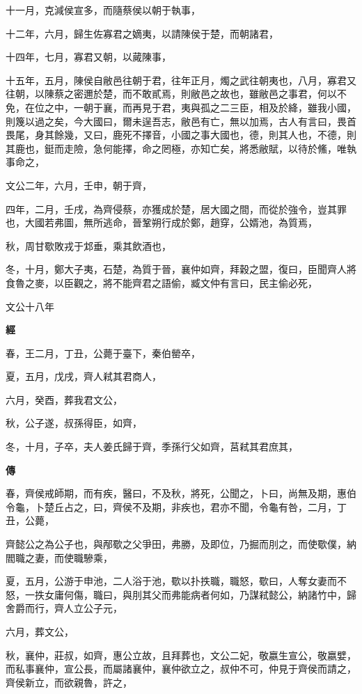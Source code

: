 \documentclass{ctexart}
\begin{document}
十一月，克減侯宣多，而隨蔡侯以朝于執事，

十二年，六月，歸生佐寡君之嫡夷，以請陳侯于楚，而朝諸君，

十四年，七月，寡君又朝，以蕆陳事，

十五年，五月，陳侯自敝邑往朝于君，往年正月，燭之武往朝夷也，八月，寡君又往朝，以陳蔡之密邇於楚，而不敢貳焉，則敝邑之故也，雖敝邑之事君，何以不免，在位之中，一朝于襄，而再見于君，夷與孤之二三臣，相及於絳，雖我小國，則篾以過之矣，今大國曰，爾未逞吾志，敝邑有亡，無以加焉，古人有言曰，畏首畏尾，身其餘幾，又曰，鹿死不擇音，小國之事大國也，德，則其人也，不德，則其鹿也，鋌而走險，急何能擇，命之罔極，亦知亡矣，將悉敝賦，以待於鯈，唯執事命之，

文公二年，六月，壬申，朝于齊，

四年，二月，壬戌，為齊侵蔡，亦獲成於楚，居大國之間，而從於強令，豈其罪也，大國若弗圖，無所逃命，晉鞏朔行成於鄭，趙穿，公婿池，為質焉，

秋，周甘歜敗戎于邥垂，乘其飲酒也，

冬，十月，鄭大子夷，石楚，為質于晉，襄仲如齊，拜穀之盟，復曰，臣聞齊人將食魯之麥，以臣觀之，將不能齊君之語偷，臧文仲有言曰，民主偷必死，





文公十八年


\textbf{經}



春，王二月，丁丑，公薨于臺下，秦伯罃卒，

夏，五月，戊戌，齊人弒其君商人，

六月，癸酉，葬我君文公，

秋，公子遂，叔孫得臣，如齊，

冬，十月，子卒，夫人姜氏歸于齊，季孫行父如齊，莒弒其君庶其，

\textbf{傳}



春，齊侯戒師期，而有疾，醫曰，不及秋，將死，公聞之，卜曰，尚無及期，惠伯令龜，卜楚丘占之，曰，齊侯不及期，非疾也，君亦不聞，令龜有咎，二月，丁丑，公薨，

齊懿公之為公子也，與邴歜之父爭田，弗勝，及即位，乃掘而刖之，而使歜僕，納閻職之妻，而使職驂乘，

夏，五月，公游于申池，二人浴于池，歜以扑抶職，職怒，歜曰，人奪女妻而不怒，一抶女庸何傷，職曰，與刖其父而弗能病者何如，乃謀弒懿公，納諸竹中，歸舍爵而行，齊人立公子元，

六月，葬文公，

秋，襄仲，莊叔，如齊，惠公立故，且拜葬也，文公二妃，敬嬴生宣公，敬嬴嬖，而私事襄仲，宣公長，而屬諸襄仲，襄仲欲立之，叔仲不可，仲見于齊侯而請之，齊侯新立，而欲親魯，許之，
\end{document}
